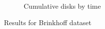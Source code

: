 \begin{figure}
\begin{subfigure}[t]{0.25\textwidth}
        \caption{Cumulative disks by time}
        \label{fig:brinkhoff_disks}
    \end{subfigure}
    \caption{Results for Brinkhoff dataset}
    \label{fig:brinkhoff_results}
\end{figure}
